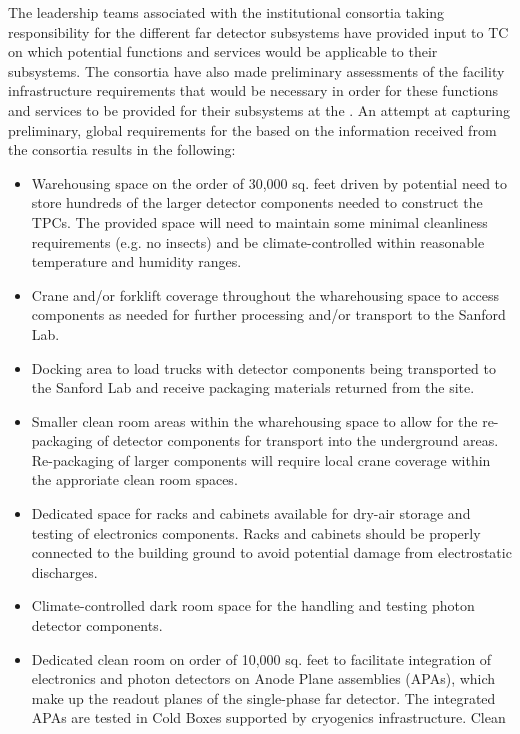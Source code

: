 The leadership teams associated with the  institutional consortia
taking responsibility for the different far detector subsystems have provided 
input to TC on which potential  functions and services would be applicable 
to their subsystems.  The consortia have also made preliminary assessments of 
the facility infrastructure requirements that would be necessary in order for 
these functions and services to be provided for their subsystems at the .
An attempt at capturing preliminary, global requirements for the  based 
on the information received from the consortia results in the following:
\begin{itemize}
  \item Warehousing space on the order of 30,000 sq. feet driven by potential 
    need to store hundreds of the larger detector components needed to construct
    the TPCs.  The provided space will need to maintain some minimal cleanliness 
    requirements (e.g. no insects) and be climate-controlled within reasonable 
    temperature and humidity ranges.
  \item Crane and/or forklift coverage throughout the wharehousing space to 
    access components as needed for further processing and/or transport to the 
    Sanford Lab.
  \item Docking area to load trucks with detector components being transported 
    to the Sanford Lab and receive packaging materials returned from the site. 
  \item Smaller clean room areas within the wharehousing space to allow for 
    the re-packaging of detector components for transport into the underground 
    areas.  Re-packaging of larger components will require local crane coverage 
    within the approriate clean room spaces.
  \item Dedicated space for racks and cabinets available for dry-air storage 
    and testing of electronics components.  Racks and cabinets should be properly 
    connected to the building ground to avoid potential damage from electrostatic 
    discharges.
  \item Climate-controlled dark room space for the handling and testing photon
    detector components.
  \item Dedicated clean room on order of 10,000 sq. feet to facilitate integration 
    of electronics and photon detectors on Anode Plane assemblies (APAs), which 
    make up the readout planes of the single-phase far detector. The integrated 
    APAs are tested in Cold Boxes supported by cryogenics infrastructure.  Clean 

\end{itemize}
